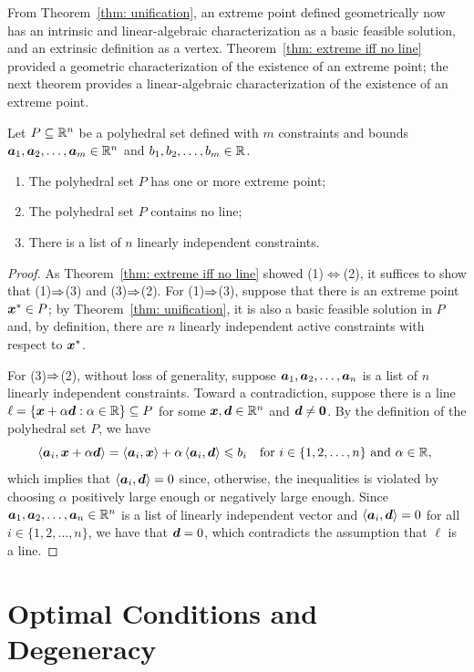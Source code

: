 From Theorem~\ref{thm: unification}, an extreme point defined geometrically now has an intrinsic and linear-algebraic characterization as a basic feasible solution, and an extrinsic definition as a vertex. Theorem~\ref{thm: extreme iff no line} provided a geometric characterization of the existence of an extreme point; the next theorem provides a linear-algebraic characterization of the existence of an extreme point. 
\begin{theorem}
Let $P \subseteq \mathbb R^n$ be a polyhedral set defined with $m$ constraints and bounds ${\boldsymbol a}_1, {\boldsymbol a}_2, \dots, {\boldsymbol a}_m \in \mathbb R^n$ and $b_1, b_2, \dots, b_m\in\mathbb R$. 
\begin{enumerate}[noitemsep]
\item The polyhedral set $P$ has one or more extreme point;
\item The polyhedral set $P$ contains no line; 
\item There is a list of $n$ linearly independent constraints. 
\end{enumerate}
\end{theorem}
\begin{proof}
As Theorem~\ref{thm: extreme iff no line} showed (1)$\iff$(2), it suffices to show that (1)$\Rightarrow$(3) and (3)$\Rightarrow$(2). For (1)$\Rightarrow$(3), suppose that there is an extreme point ${\boldsymbol x}^\ast\in P$; by Theorem~\ref{thm: unification}, it is also a basic feasible solution in $P$ and, by definition, there are $n$ linearly independent active constraints with respect to ${\boldsymbol x}^\ast$. 

For (3)$\Rightarrow$(2), without loss of generality, suppose ${\boldsymbol a}_1, {\boldsymbol a}_2, \dots, {\boldsymbol a}_n$ is a list of $n$ linearly independent constraints. Toward a contradiction, suppose there is a line $\ell = \{ {\boldsymbol x} + \alpha{\boldsymbol d} : \alpha\in\mathbb R \}\subseteq P$ for some ${\boldsymbol x}, {\boldsymbol d}\in\mathbb R^n$ and ${\boldsymbol d}\neq\boldsymbol0$. By the definition of the polyhedral set $P$, we have \[\left\langle{\boldsymbol a}_i, {\boldsymbol x} + \alpha{\boldsymbol d}\right\rangle = \left\langle{\boldsymbol a}_i, {\boldsymbol x} \right\rangle + \alpha\left\langle{\boldsymbol a}_i, {\boldsymbol d}\right\rangle \leqslant b_i \quad\text{for $i\in\{1,2,\dots, n\}$ and $\alpha\in\mathbb R$, } \] which implies that $\left\langle{\boldsymbol a}_i, {\boldsymbol d}\right\rangle = 0$ since, otherwise, the inequalities is violated by choosing $\alpha$ positively large enough or negatively large enough. Since ${\boldsymbol a}_1, {\boldsymbol a}_2, \dots, {\boldsymbol a}_n \in \mathbb R^n$ is a list of linearly independent vector and $\left\langle {\boldsymbol a}_i, {\boldsymbol d} \right\rangle = 0$ for all $i\in\{1,2,\dots, n\}$, we have that ${\boldsymbol d} = 0$, which contradicts the assumption that $\ell$ is a line. 
\end{proof}

\section{Optimal Conditions and Degeneracy}\label{sec:OptimalDegeneracy}

